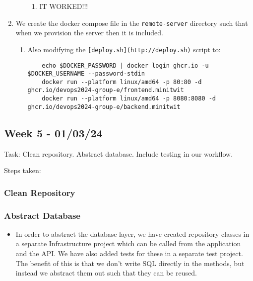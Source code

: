 \begin{enumerate}
\begin{enumerate}
        \begin{enumerate}
            \item IT WORKED!!!
        \end{enumerate}
    \end{enumerate}
    \item We create the docker compose file in the \texttt{remote-server} directory such that when we provision the server then it is included.

    \begin{enumerate}
        \item Also modifying the \texttt{{[}deploy.sh{]}(http://deploy.sh)} script to:

\begin{verbatim}
    echo $DOCKER_PASSWORD | docker login ghcr.io -u $DOCKER_USERNAME --password-stdin
    docker run --platform linux/amd64 -p 80:80 -d ghcr.io/devops2024-group-e/frontend.minitwit
    docker run --platform linux/amd64 -p 8080:8080 -d ghcr.io/devops2024-group-e/backend.minitwit
\end{verbatim}
    \end{enumerate}
\end{enumerate}

\subsection{Week 5 - 01/03/24}
\label{log:week5}

Task: Clean repository. Abstract database. Include testing in our
workflow.

Steps taken:

\subsubsection{Clean Repository}
\label{log:clean-repository}

\subsubsection{Abstract Database}
\label{log:abstract-database}

\begin{itemize}
    \item In order to abstract the database layer, we have created repository classes in a separate Infrastructure project which can be called from the application and the API. We have also added tests for these in a separate test project. The benefit of this is that we don't write SQL directly in the methods, but instead we abstract them out such that they can be reused.
\end{itemize}

